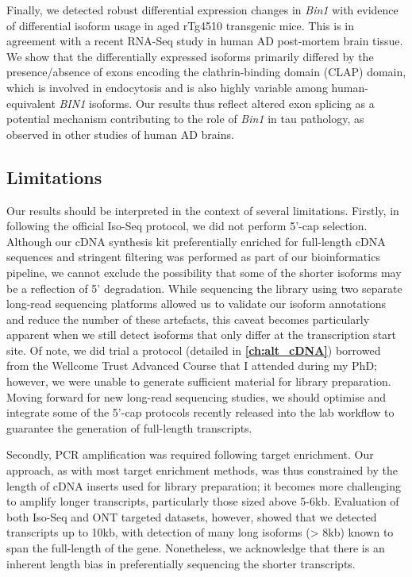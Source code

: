 Finally, we detected robust differential expression changes in \textit{Bin1} with evidence of differential isoform usage in aged rTg4510 transgenic mice. This is in agreement with a recent RNA-Seq study in human AD post-mortem brain tissue\cite{Marques-Coelho2021}. We show that the differentially expressed isoforms primarily differed by the presence/absence of exons encoding the clathrin-binding domain (CLAP) domain, which is involved in endocytosis and is also highly variable among human-equivalent \textit{BIN1} isoforms\cite{Taga2020}. Our results thus reflect altered exon splicing as a potential mechanism contributing to the role of \textit{Bin1} in tau pathology, as observed in other studies of human AD brains\cite{Marques-Coelho2021, Taga2020}.  


\subsection{Limitations}
Our results should be interpreted in the context of several limitations. Firstly, in following the official Iso-Seq protocol, we did not perform 5'-cap selection. Although our cDNA synthesis kit preferentially enriched for full-length cDNA sequences and stringent filtering was performed as part of our bioinformatics pipeline, we cannot exclude the possibility that some of the shorter isoforms may be a reflection of 5' degradation. While sequencing the library using two separate long-read sequencing platforms allowed us to validate our isoform annotations and reduce the number of these artefacts, this caveat becomes particularly apparent when we still detect isoforms that only differ at the transcription start site. Of note, we did trial a protocol (detailed in \textbf{\cref{ch:alt_cDNA}}) borrowed from the Wellcome Trust Advanced Course that I attended during my PhD; however, we were unable to generate sufficient material for library preparation. Moving forward for new long-read sequencing studies, we should optimise and integrate some of the 5'-cap protocols recently released \cite{Kuo2020,Jiang2019} into the lab workflow to guarantee the generation of full-length transcripts.   

Secondly, PCR amplification was required following target enrichment. Our approach, as with most target enrichment methods, was thus constrained by the length of cDNA inserts used for library preparation; it becomes more challenging to amplify longer transcripts, particularly those sized above 5-6kb\cite{Sheynkman2020}. Evaluation of both Iso-Seq and ONT targeted datasets, however, showed that we detected transcripts up to 10kb, with detection of many long isoforms (> 8kb) known to span the full-length of the gene. Nonetheless, we acknowledge that there is an inherent length bias in preferentially sequencing the shorter transcripts. 

